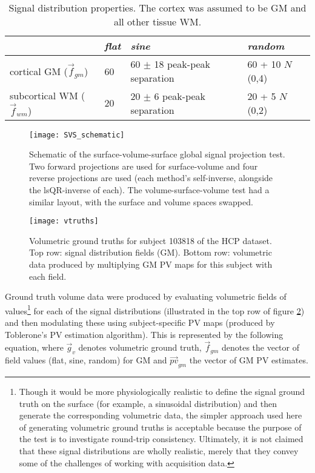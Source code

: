 \begin{table}[H]
\centering
\def\arraystretch{1.5}
\newcommand{\wrap}[1]{\parbox{\linewidth}{\vspace{1.5mm}#1\vspace{1mm}}}
\begin{tabular}{p{4cm}|p{1.5cm}p{5cm}p{3cm}}
& \textit{flat}  & \textit{sine} & \textit{random} \\ \hline
cortical GM ($\vec{f}_{gm}$) & 60 & \wrap{60 $\pm$ 18 \\ peak-peak separation } & 60 + 10 $N$(0,4) \\
subcortical WM ($\vec{f}_{wm}$) & 20 & \wrap{20 $\pm$ 6 \\ peak-peak separation } & 20 + 5 $N$(0,2) \\
\end{tabular}
\caption{Signal distribution properties. The cortex was assumed to be GM and all other tissue WM.}
\label{signaltable}
\end{table}


\begin{figure}[H]
\centering
\texttt{[image: SVS\_schematic]}
\caption{Schematic of the surface-volume-surface global signal projection test. Two forward projections are used for surface-volume and four reverse projections are used (each method's self-inverse, alongside the lsQR-inverse of each). The volume-surface-volume test had a similar layout, with the surface and volume spaces swapped.}
\label{SVS_schematic} 
\end{figure}

\begin{figure}[H]
\centering
\texttt{[image: vtruths]}
\caption{Volumetric ground truths for subject 103818 of the HCP dataset. Top row: signal distribution fields (GM). Bottom row: volumetric data produced by multiplying GM PV maps for this subject with each field.}
\label{vol_truth} 
\end{figure}

Ground truth volume data were produced by evaluating volumetric fields of values\footnote{Though it would be more physiologically realistic to define the signal ground truth on the surface (for example, a sinusoidal distribution) and then generate the corresponding volumetric data, the simpler approach used here of generating volumetric ground truths is acceptable because the purpose of the test is to investigate round-trip consistency. Ultimately, it is not claimed that these signal distributions are wholly realistic, merely that they convey some of the challenges of working with acquisition data.} for each of the signal distributions (illustrated in the top row of figure \ref{vol_truth}) and then modulating these using subject-specific PV maps (produced by Toblerone's PV estimation algorithm). This is represented by the following equation, where $\vec{g}_v$ denotes volumetric ground truth, $\vec{f}_{gm}$ denotes the vector of field values (flat, sine, random) for GM and $\vec{pv}_{gm}$ the vector of GM PV estimates.

